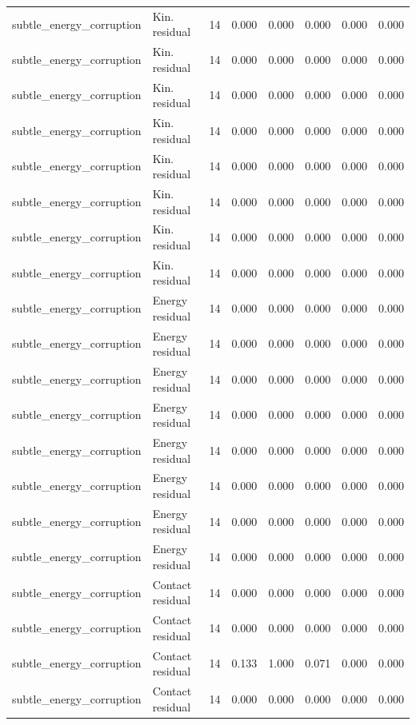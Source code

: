 {\begin{longtable}{llrrrrrr}
subtle\_energy\_corruption & Kin. residual & 14 & 0.000 & 0.000 & 0.000 & 0.000 & 0.000 \\
subtle\_energy\_corruption & Kin. residual & 14 & 0.000 & 0.000 & 0.000 & 0.000 & 0.000 \\
subtle\_energy\_corruption & Kin. residual & 14 & 0.000 & 0.000 & 0.000 & 0.000 & 0.000 \\
subtle\_energy\_corruption & Kin. residual & 14 & 0.000 & 0.000 & 0.000 & 0.000 & 0.000 \\
subtle\_energy\_corruption & Kin. residual & 14 & 0.000 & 0.000 & 0.000 & 0.000 & 0.000 \\
subtle\_energy\_corruption & Kin. residual & 14 & 0.000 & 0.000 & 0.000 & 0.000 & 0.000 \\
subtle\_energy\_corruption & Kin. residual & 14 & 0.000 & 0.000 & 0.000 & 0.000 & 0.000 \\
subtle\_energy\_corruption & Kin. residual & 14 & 0.000 & 0.000 & 0.000 & 0.000 & 0.000 \\
subtle\_energy\_corruption & Energy residual & 14 & 0.000 & 0.000 & 0.000 & 0.000 & 0.000 \\
subtle\_energy\_corruption & Energy residual & 14 & 0.000 & 0.000 & 0.000 & 0.000 & 0.000 \\
subtle\_energy\_corruption & Energy residual & 14 & 0.000 & 0.000 & 0.000 & 0.000 & 0.000 \\
subtle\_energy\_corruption & Energy residual & 14 & 0.000 & 0.000 & 0.000 & 0.000 & 0.000 \\
subtle\_energy\_corruption & Energy residual & 14 & 0.000 & 0.000 & 0.000 & 0.000 & 0.000 \\
subtle\_energy\_corruption & Energy residual & 14 & 0.000 & 0.000 & 0.000 & 0.000 & 0.000 \\
subtle\_energy\_corruption & Energy residual & 14 & 0.000 & 0.000 & 0.000 & 0.000 & 0.000 \\
subtle\_energy\_corruption & Energy residual & 14 & 0.000 & 0.000 & 0.000 & 0.000 & 0.000 \\
subtle\_energy\_corruption & Contact residual & 14 & 0.000 & 0.000 & 0.000 & 0.000 & 0.000 \\
subtle\_energy\_corruption & Contact residual & 14 & 0.000 & 0.000 & 0.000 & 0.000 & 0.000 \\
subtle\_energy\_corruption & Contact residual & 14 & 0.133 & 1.000 & 0.071 & 0.000 & 0.000 \\
subtle\_energy\_corruption & Contact residual & 14 & 0.000 & 0.000 & 0.000 & 0.000 & 0.000 \\

\end{longtable}}
